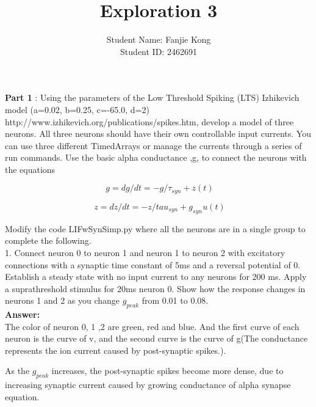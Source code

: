 \documentclass[12pt]{article}
\title{Exploration 3}
\author{Student Name: Fanjie Kong
\\
Student ID: 2462691 }
\begin{document}
\maketitle
\newpage
\textbf{Part 1} : Using the parameters of the Low Threshold Spiking (LTS) Izhikevich model
(a=0.02, b=0.25, c=-65.0, d=2) http://www.izhikevich.org/publications/spikes.htm,
develop a model of three neurons. All three neurons should have their own controllable
input currents. You can use three different TimedArrays or manage the currents through a
series of run commands. Use the basic alpha conductance ,g, to connect the neurons with
the equations
 
$$ g= dg/dt =
−g/\tau_{syn}
+z(t)$$
 
$$ z= dz/dt =
−z/tau_{syn}
+g_{syn}u(t)$$

Modify the code LIFwSynSimp.py where all
the neurons are in a single group to complete the following. 
\\

1. Connect neuron 0 to neuron 1 and neuron 1 to neuron 2 with excitatory
connections with a synaptic time constant of 5ms and a reversal potential of 0.
Establish a steady state with no input current to any neurons for 200 ms. Apply a
suprathreshold stimulus for 20ms neuron 0. Show how the response changes in
neurons 1 and 2 as you change $g_{peak}$ from 0.01 to 0.08.
\\

\textbf{Answer:} 
\\

The color of neuron 0, 1 ,2 are green, red and blue. And the first curve of each neuron is the curve of v, and the second curve is the curve of g(The conductance represents the ion current caused by post-synaptic spikes.).

As the $g_{peak}$ increases, the post-synaptic spikes become more dense, due to increasing synaptic current caused by growing conductance of alpha synapse equation.
\end{document}
